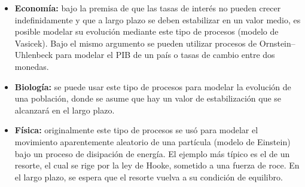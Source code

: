 \begin{itemize}
    \item \textbf{Economía:} bajo la premisa de que las tasas de interés no pueden crecer indefinidamente y que a largo plazo se deben estabilizar en un valor medio, es posible modelar su evolución mediante este tipo de procesos (modelo de Vasicek). Bajo el mismo argumento se pueden utilizar procesos de Ornstein–Uhlenbeck para modelar el PIB de un país o tasas de cambio entre dos monedas.
    \item \textbf{Biología:} se puede usar este tipo de procesos para modelar la evolución de una población, donde se asume que hay un valor de estabilización que se alcanzará en el largo plazo.
    \item \textbf{Física:} originalmente este tipo de procesos se usó para modelar el movimiento aparentemente aleatorio de una partícula (modelo de Einstein) bajo un proceso de disipación de energía. El ejemplo más típico es el de un resorte, el cual se rige por la ley de Hooke, sometido a una fuerza de roce. En el largo plazo, se espera que el resorte vuelva a su condición de equilibro.
\end{itemize}

